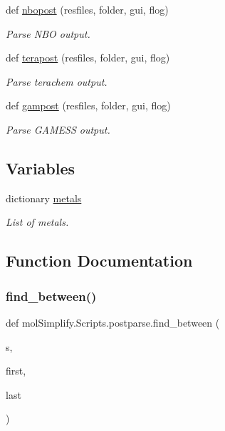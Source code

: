 \begin{DoxyCompactItemize}
def \hyperlink{namespacemolSimplify_1_1Scripts_1_1postparse_a5f83458726e6d0b908bf86748fdf70d2}{nbopost} (resfiles, folder, gui, flog)
\begin{DoxyCompactList}\small\item\em Parse N\+BO output. \end{DoxyCompactList}\item 
def \hyperlink{namespacemolSimplify_1_1Scripts_1_1postparse_aaac627b8678db1fa4627ae706a3464fd}{terapost} (resfiles, folder, gui, flog)
\begin{DoxyCompactList}\small\item\em Parse terachem output. \end{DoxyCompactList}\item 
def \hyperlink{namespacemolSimplify_1_1Scripts_1_1postparse_ab4b2775a181fdb022a76cfd9d290cd59}{gampost} (resfiles, folder, gui, flog)
\begin{DoxyCompactList}\small\item\em Parse G\+A\+M\+E\+SS output. \end{DoxyCompactList}\end{DoxyCompactItemize}
\subsection*{Variables}
\begin{DoxyCompactItemize}
\item 
dictionary \hyperlink{namespacemolSimplify_1_1Scripts_1_1postparse_af6144507bc4cf4e5b0a26d5635fdf234}{metals}
\begin{DoxyCompactList}\small\item\em List of metals. \end{DoxyCompactList}\end{DoxyCompactItemize}


\subsection{Function Documentation}
\mbox{\label{namespacemolSimplify_1_1Scripts_1_1postparse_a04fb9ea18ce31d7b1293555e11e45baa}} 
\subsubsection{\texorpdfstring{find\+\_\+between()}{find\_between()}}
{\footnotesize\ttfamily def mol\+Simplify.\+Scripts.\+postparse.\+find\+\_\+between (\begin{DoxyParamCaption}\item[{}]{s,  }\item[{}]{first,  }\item[{}]{last }\end{DoxyParamCaption})}



